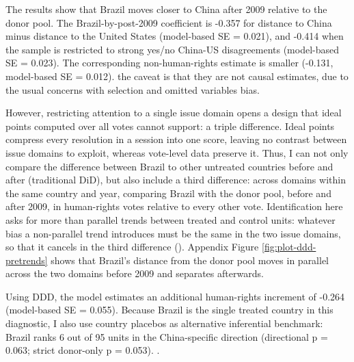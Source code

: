 \documentclass[
  12pt,
]{article}
\begin{document}
The results show that Brazil moves closer to China after 2009 relative to the donor pool. The Brazil-by-post-2009 coefficient is -0.357 for distance to China minus distance to the United States (model-based SE = 0.021), and -0.414 when the sample is restricted to strong yes/no China-US disagreements (model-based SE = 0.023). The corresponding non-human-rights estimate is smaller (-0.131, model-based SE = 0.012). the caveat is that they are not causal estimates, due to the usual concerns with selection and omitted variables bias.

However, restricting attention to a single issue domain opens a design that ideal points computed over all votes cannot support: a triple difference. Ideal points compress every resolution in a session into one score, leaving no contrast between issue domains to exploit, whereas vote-level data preserve it. Thus, I can not only compare the difference between Brazil to other untreated countries before and after (traditional DiD), but also include a third difference: across domains within the same country and year, comparing Brazil with the donor pool, before and after 2009, in human-rights votes relative to every other vote. Identification here asks for more than parallel trends between treated and control units: whatever bias a non-parallel trend introduces must be the same in the two issue domains, so that it cancels in the third difference (). Appendix Figure \ref{fig:plot-ddd-pretrends} shows that Brazil's distance from the donor pool moves in parallel across the two domains before 2009 and separates afterwards.

Using DDD, the model estimates an additional human-rights increment of -0.264 (model-based SE = 0.055).
Because Brazil is the single treated country in this diagnostic, I also use country placebos as alternative inferential benchmark: Brazil ranks 6 out of 95 units in the China-specific direction (directional p = 0.063; strict donor-only p = 0.053). .
\end{document}
